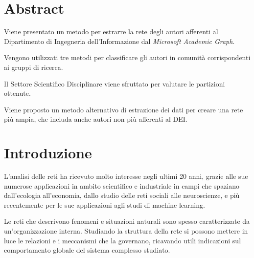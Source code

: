 \documentclass[12pt,a4paper,twoside]{report}
\begin{document}
\whitePage


\tableofcontents





\whitePage



\newpage
{}
\setcounter{page}{1}
\section*{Abstract} \label{abstract} %

Viene presentato un metodo per estrarre la rete degli autori afferenti al Dipartimento di Ingegneria
dell'Informazione dal \textit{Microsoft Academic Graph}.

Vengono utilizzati tre metodi per classificare gli autori in comunità corrispondenti ai gruppi di
ricerca.

Il Settore Scientifico Disciplinare viene sfruttato per valutare le partizioni ottenute.

Viene proposto un metodo alternativo di estrazione dei dati per creare una rete più ampia, che
includa anche autori non più afferenti al DEI.

\section*{Introduzione} \label{introduzione}

L'analisi delle reti ha ricevuto molto interesse negli ultimi 20 anni, grazie alle sue numerose
applicazioni in ambito scientifico e industriale in campi che spaziano dall'ecologia all'economia,
dallo studio delle reti sociali alle neuroscienze, e più recentemente per le sue applicazioni agli
studi di machine learning.

Le reti che descrivono fenomeni e situazioni naturali sono spesso caratterizzate da
un'organizzazione interna. Studiando la struttura della rete si possono mettere
in luce le relazioni e i meccanismi che la governano, ricavando utili indicazioni sul comportamento
globale del sistema complesso studiato.
\end{document}
